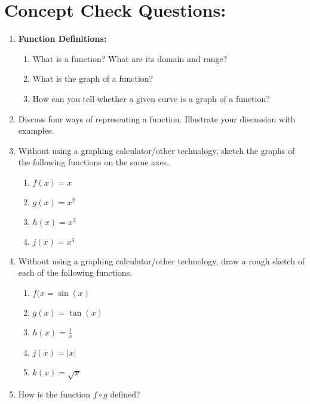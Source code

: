 \section*{Concept Check Questions:}

\begin{enumerate}

\item \textbf{Function Definitions:}
\begin{enumerate}
\item What is a function? What are its domain and range?
\item What is the graph of a function?
\item How can you tell whether a given curve is a graph of a function?

\end{enumerate}

\item Discuss four ways of representing a function. Illustrate your discussion with examples.

\item Without using a graphing calculator/other technology, sketch the graphs of the following functions  on the same axes.
\begin{enumerate}
\item \(f(x) = x\)
\item \(g(x) = x^2\)
\item \(h(x) = x^3\)
\item \(j(x) = x^4\)
\end{enumerate}

\item Without using a graphing calculator/other technology, draw a rough sketch of each of the following functions.
\begin{enumerate}
\item \(f(x = \sin(x)\)
\item \(g(x) = \tan(x)\)
\item \(h(x) = \frac{1}{x}\)
\item \(j(x) = |x|\)
\item \(k(x) = \sqrt{x}\)
\end{enumerate}

\item How is the function \(f \circ g\) defined?


\end{enumerate}
